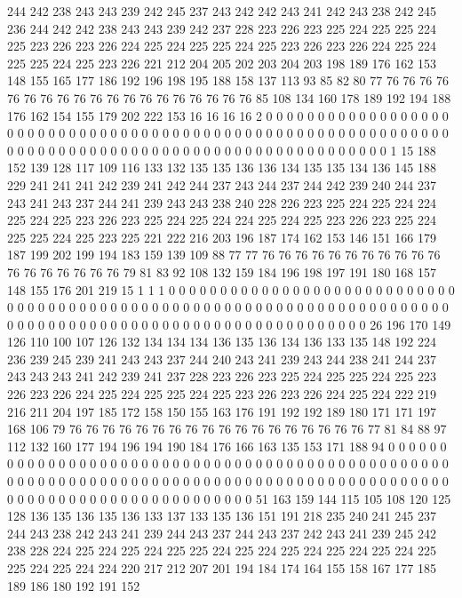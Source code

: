 244 242 238 243 243 239 242 245 237 243 242 242 243 241 242 243 238 242 245 236
244 242 242 238 243 243 239 242 237 228 223 226 223 225 224 225 225 224 225 223
226 223 226 224 225 224 225 225 224 225 223 226 223 226 224 225 224 225 225 224
225 223 226 221 212 204 205 202 203 204 203 198 189 176 162 153 148 155 165 177
186 192 196 198 195 188 158 137 113 93 85 82 80 77 76 76 76 76 76 76
76 76 76 76 76 76 76 76 76 76 76 76 76 85 108 134 160 178 189 192
194 188 176 162 154 155 179 202 222 153 16 16 16 16 2 0 0 0 0 0
0 0 0 0 0 0 0 0 0 0 0 0 0 0 0 0 0 0 0 0
0 0 0 0 0 0 0 0 0 0 0 0 0 0 0 0 0 0 0 0
0 0 0 0 0 0 0 0 0 0 0 0 0 0 0 0 0 0 0 0
0 0 0 0 0 0 0 0 0 0 0 0 0 0 0 0 0 0 0 0
0 0 0 0 0 0 0 0 0 0 0 0 0 1 15 188 152 139 128 117
109 116 133 132 135 135 136 136 134 135 135 134 136 145 188 229 241 241 241 242
239 241 242 244 237 243 244 237 244 242 239 240 244 237 243 241 243 237 244 241
239 243 243 238 240 228 226 223 225 224 225 224 224 225 224 225 223 226 223 225
224 225 224 224 225 224 225 223 226 223 225 224 225 225 224 225 223 225 221 222
216 203 196 187 174 162 153 146 151 166 179 187 199 202 199 194 183 159 139 109
88 77 77 76 76 76 76 76 76 76 76 76 76 76 76 76 76 76 76 76
76 79 81 83 92 108 132 159 184 196 198 197 191 180 168 157 148 155 176 201
219 15 1 1 1 0 0 0 0 0 0 0 0 0 0 0 0 0 0 0
0 0 0 0 0 0 0 0 0 0 0 0 0 0 0 0 0 0 0 0
0 0 0 0 0 0 0 0 0 0 0 0 0 0 0 0 0 0 0 0
0 0 0 0 0 0 0 0 0 0 0 0 0 0 0 0 0 0 0 0
0 0 0 0 0 0 0 0 0 0 0 0 0 0 0 0 0 0 0 0
0 0 0 0 0 0 0 0 0 0 0 26 196 170 149 126 110 100 107 126
132 134 134 134 136 135 136 134 136 133 135 148 192 224 236 239 245 239 241 243
243 237 244 240 243 241 239 243 244 238 241 244 237 243 243 243 241 242 239 241
237 228 223 226 223 225 224 225 225 224 225 223 226 223 226 224 225 224 225 225
224 225 223 226 223 226 224 225 224 222 219 216 211 204 197 185 172 158 150 155
163 176 191 192 192 189 180 171 171 197 168 106 79 76 76 76 76 76 76 76
76 76 76 76 76 76 76 76 76 76 76 77 81 84 88 97 112 132 160 177
194 196 194 190 184 176 166 163 135 153 171 188 94 0 0 0 0 0 0 0
0 0 0 0 0 0 0 0 0 0 0 0 0 0 0 0 0 0 0 0
0 0 0 0 0 0 0 0 0 0 0 0 0 0 0 0 0 0 0 0
0 0 0 0 0 0 0 0 0 0 0 0 0 0 0 0 0 0 0 0
0 0 0 0 0 0 0 0 0 0 0 0 0 0 0 0 0 0 0 0
0 0 0 0 0 0 0 0 0 0 0 0 0 0 0 0 0 0 0 0
0 0 0 0 0 0 0 0 0 51 163 159 144 115 105 108 120 125 128 136
135 136 135 136 133 137 133 135 136 151 191 218 235 240 241 245 237 244 243 238
242 243 241 239 244 243 237 244 243 237 242 243 241 239 245 242 238 228 224 225
224 225 224 225 225 224 225 224 225 224 225 224 225 224 225 225 224 225 224 224
220 217 212 207 201 194 184 174 164 155 158 167 177 185 189 186 180 192 191 152

